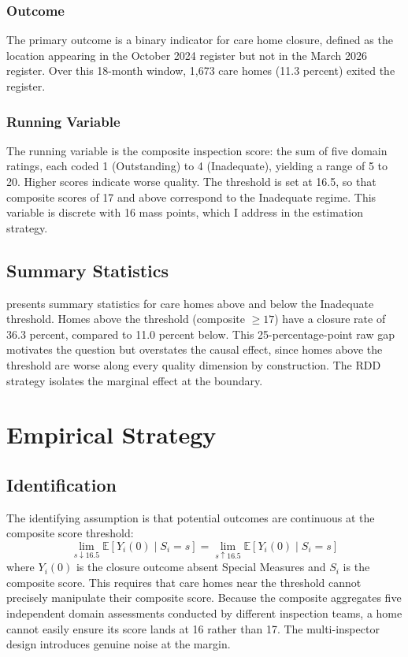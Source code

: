 \documentclass[12pt]{article}
\newcommand{\E}{\mathbb{E}}
\begin{document}
\subsubsection*{Outcome} The primary outcome is a binary indicator for care home closure, defined as the location appearing in the October 2024 register but not in the March 2026 register. Over this 18-month window, 1,673 care homes (11.3 percent) exited the register.

\subsubsection*{Running Variable} The running variable is the composite inspection score: the sum of five domain ratings, each coded 1 (Outstanding) to 4 (Inadequate), yielding a range of 5 to 20. Higher scores indicate worse quality. The threshold is set at 16.5, so that composite scores of 17 and above correspond to the Inadequate regime. This variable is discrete with 16 mass points, which I address in the estimation strategy.

\subsection{Summary Statistics}



 presents summary statistics for care homes above and below the Inadequate threshold. Homes above the threshold (composite $\geq 17$) have a closure rate of 36.3 percent, compared to 11.0 percent below. This 25-percentage-point raw gap motivates the question but overstates the causal effect, since homes above the threshold are worse along every quality dimension by construction. The RDD strategy isolates the marginal effect at the boundary.

\section{Empirical Strategy}

\subsection{Identification}

The identifying assumption is that potential outcomes are continuous at the composite score threshold:
\begin{equation}
\lim_{s \downarrow 16.5} \E[Y_i(0) \mid S_i = s] = \lim_{s \uparrow 16.5} \E[Y_i(0) \mid S_i = s]
\end{equation}
where $Y_i(0)$ is the closure outcome absent Special Measures and $S_i$ is the composite score. This requires that care homes near the threshold cannot precisely manipulate their composite score. Because the composite aggregates five independent domain assessments conducted by different inspection teams, a home cannot easily ensure its score lands at 16 rather than 17. The multi-inspector design introduces genuine noise at the margin.
\end{document}
